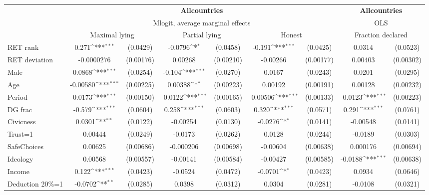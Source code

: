 \def\sym#1{\ifmmode^{#1}\else\(^{#1}\)\fi}
\begin{tabular}{l|cccccc|cc}
\hline\hline
&\multicolumn{6}{c|}{\bf All\space{}countries}&\multicolumn{2}{c}{\bf All\space{}countries}\\ &\multicolumn{6}{c|}{Mlogit, average marginal effects }&\multicolumn{2}{c}{OLS}\\
                &\multicolumn{2}{c}{Maximal lying}&\multicolumn{2}{c}{Partial lying}&\multicolumn{2}{c}{Honest}  &\multicolumn{2}{c}{Fraction declared}\\
\hline
RET rank        &    0.271\sym{***}& (0.0429)&  -0.0796\sym{*}  & (0.0458)&   -0.191\sym{***}& (0.0425)&   0.0314         & (0.0523)\\
RET deviation   &-0.0000276         &(0.00176)&  0.00268         &(0.00210)& -0.00266         &(0.00177)&  0.00403         &(0.00302)\\
Male            &   0.0868\sym{***}& (0.0254)&   -0.104\sym{***}& (0.0270)&   0.0167         & (0.0243)&   0.0201         & (0.0295)\\
Age             & -0.00580\sym{***}&(0.00225)&  0.00388\sym{*}  &(0.00223)&  0.00192         &(0.00191)&  0.00128         &(0.00232)\\
Period          &   0.0173\sym{***}&(0.00150)&  -0.0122\sym{***}&(0.00165)& -0.00506\sym{***}&(0.00133)&  -0.0123\sym{***}&(0.00223)\\
DG frac         &   -0.579\sym{***}& (0.0604)&    0.258\sym{***}& (0.0603)&    0.320\sym{***}& (0.0571)&    0.291\sym{***}& (0.0761)\\
Civicness       &   0.0301\sym{**} & (0.0122)& -0.00254         & (0.0130)&  -0.0276\sym{*}  & (0.0141)& -0.00548         & (0.0141)\\
Trust=1         &  0.00444         & (0.0249)&  -0.0173         & (0.0262)&   0.0128         & (0.0244)&  -0.0189         & (0.0303)\\
SafeChoices     &  0.00625         &(0.00686)&-0.000206         &(0.00698)& -0.00604         &(0.00638)& 0.000176         &(0.00694)\\
Ideology        &  0.00568         &(0.00557)& -0.00141         &(0.00584)& -0.00427         &(0.00585)&  -0.0188\sym{***}&(0.00638)\\
Income          &    0.122\sym{***}& (0.0423)&  -0.0524         & (0.0472)&  -0.0701\sym{*}  & (0.0423)&   0.0934         & (0.0646)\\
Deduction 20\%=1&  -0.0702\sym{**} & (0.0285)&   0.0398         & (0.0312)&   0.0304         & (0.0281)&  -0.0108         & (0.0321)\\

\end{tabular}
